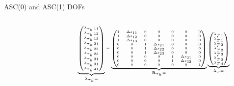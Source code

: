 \documentclass[svgnames]{beamer} %
\newcommand{\vect}[1]{\boldsymbol{\mathbf{#1}}}
\newcommand{\mmesh}{{\vect{\mathcal \tau}_h}}
\begin{document}
\begin{frame}{ASC(0) and ASC(1) DOFs}
\begin{columns}
\begin{column}{.5\textwidth}
\begin{equation*}
				\end{equation*}
				\endgroup
			\end{column}
			\begin{column}{.5\textwidth}
				\begingroup
				\setlength\arraycolsep{1pt}
				\begin{equation*}\tiny
					\underbrace{\begin{pmatrix}
						\lambda_{\mmesh\,11} \\
						\lambda_{\mmesh\,12} \\
						\lambda_{\mmesh\,13} \\
						\lambda_{\mmesh\,21} \\
						\lambda_{\mmesh\,22} \\
						\lambda_{\mmesh\,23} \\
						\lambda_{\mmesh\,31} \\
						\lambda_{\mmesh\,31} \\
						\lambda_{\mmesh\,41}
						\end{pmatrix}}_{\bar{\vect \lambda}_\mmesh =}
					= 
					\underbrace{\begin{pmatrix}
						1 & \Delta s_{11} & 0 & 0 & 0 & 0 & 0 \\
						1 & \Delta s_{12} & 0 & 0 & 0 & 0 & 0 \\
						1 & \Delta s_{13} & 0 & 0 & 0 & 0 & 0 \\
						0 & 0 & 1 & \Delta s_{21} & 0 & 0 & 0 \\
						0 & 0 & 1 & \Delta s_{22} & 0 & 0 & 0 \\
						0 & 0 & 1 & \Delta s_{23} & 0 & 0 & 0 \\
						0 & 0 & 0 & 0 & 1 & \Delta s_{31} & 0 \\
						0 & 0 & 0 & 0 & 1 & \Delta s_{32} & 0 \\
						0 & 0 & 0 & 0 & 0 & 0 & 1 \\
						\end{pmatrix}}_{\vect R_\mmesh =}
					\underbrace{\begin{pmatrix}
						\lambda_{T\,1} \\
						\lambda'_{T\,1} \\
						\lambda_{T\,2} \\
						\lambda'_{T\,2} \\
						\lambda_{T\,3} \\
						\lambda'_{T\,3} \\
						\lambda_{T\,4}
						\end{pmatrix}}_{\bar{\vect \lambda}_T =}
				\end{equation*}
				\endgroup
			\end{column}
		\end{columns}
	\end{frame}
\end{document}
